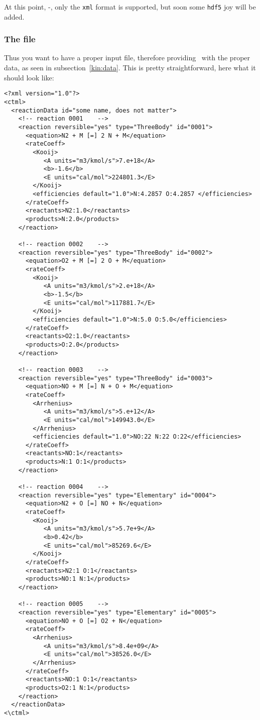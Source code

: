 At this point, \antioch-\theversion, only the \verb!xml! format is
supported, but soon some \verb!hdf5! joy will be added.

\subsubsection{The file}

Thus you want to have a proper input file, therefore providing
\Antioch\ with the proper data, as seen in subsection~\ref{kin:data}.
This is pretty straightforward, here what it should look like:
\begin{verbatim}
<?xml version="1.0"?>
<ctml>
  <reactionData id="some name, does not matter">
    <!-- reaction 0001    -->
    <reaction reversible="yes" type="ThreeBody" id="0001">
      <equation>N2 + M [=] 2 N + M</equation>
      <rateCoeff>
        <Kooij>
           <A units="m3/kmol/s">7.e+18</A>
           <b>-1.6</b>
           <E units="cal/mol">224801.3</E>
        </Kooij>
        <efficiencies default="1.0">N:4.2857 O:4.2857 </efficiencies>
      </rateCoeff>
      <reactants>N2:1.0</reactants>
      <products>N:2.0</products>
    </reaction>

    <!-- reaction 0002    -->
    <reaction reversible="yes" type="ThreeBody" id="0002">
      <equation>O2 + M [=] 2 O + M</equation>
      <rateCoeff>
        <Kooij>
           <A units="m3/kmol/s">2.e+18</A>
           <b>-1.5</b>
           <E units="cal/mol">117881.7</E>
        </Kooij>
        <efficiencies default="1.0">N:5.0 O:5.0</efficiencies>
      </rateCoeff>
      <reactants>O2:1.0</reactants>
      <products>O:2.0</products>
    </reaction>

    <!-- reaction 0003    -->
    <reaction reversible="yes" type="ThreeBody" id="0003">
      <equation>NO + M [=] N + O + M</equation>
      <rateCoeff>
        <Arrhenius>
           <A units="m3/kmol/s">5.e+12</A>
           <E units="cal/mol">149943.0</E>
        </Arrhenius>
        <efficiencies default="1.0">NO:22 N:22 O:22</efficiencies>
      </rateCoeff>
      <reactants>NO:1</reactants>
      <products>N:1 O:1</products>
    </reaction>

    <!-- reaction 0004    -->
    <reaction reversible="yes" type="Elementary" id="0004">
      <equation>N2 + O [=] NO + N</equation>
      <rateCoeff>
        <Kooij>
           <A units="m3/kmol/s">5.7e+9</A>
           <b>0.42</b>
           <E units="cal/mol">85269.6</E>
        </Kooij>
      </rateCoeff>
      <reactants>N2:1 O:1</reactants>
      <products>NO:1 N:1</products>
    </reaction>

    <!-- reaction 0005    -->
    <reaction reversible="yes" type="Elementary" id="0005">
      <equation>NO + O [=] O2 + N</equation>
      <rateCoeff>
        <Arrhenius>
           <A units="m3/kmol/s">8.4e+09</A>
           <E units="cal/mol">38526.0</E>
        </Arrhenius>
      </rateCoeff>
      <reactants>NO:1 O:1</reactants>
      <products>O2:1 N:1</products>
    </reaction>
  </reactionData>
<\ctml>
\end{verbatim}

